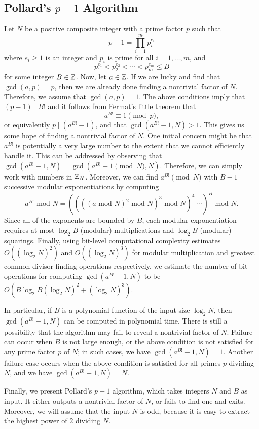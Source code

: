 \subsection{Pollard's $p-1$ Algorithm}
Let $N$ be a positive composite integer with a prime factor $p$ such that 
\[ p-1 = \prod_{i=1}^m p_i^{e_i} \] 
where $e_i \geq 1$ is an integer and $p_i$ is prime for all $i = 1, \dots, m$, and 
\[ p_1^{e_1} < p_2^{e_2} < \cdots < p_m^{e_m} \leq B \] 
for some integer $B \in \mathbb{Z}$. Now, let $a \in \mathbb{Z}$. If we are lucky and find that 
$\gcd(a, p) = p$, then we are already done finding a nontrivial factor of $N$. 
Therefore, we assume that $\gcd(a, p) = 1$. The above conditions imply that 
$(p-1) \mid B!$ and it follows from Fermat's little theorem that 
\[ a^{B!} \equiv 1 \pmod p, \] 
or equivalently $p \mid (a^{B!} - 1)$, and that $\gcd(a^{B!} - 1, N) > 1$. 
This gives us some hope of finding a nontrivial factor of $N$. One 
initial concern might be that $a^{B!}$ is potentially a very large number 
to the extent that we cannot efficiently handle it. This can be addressed by 
observing that $\gcd(a^{B!}-1, N) = \gcd(a^{B!}-1 \pmod N, N)$. Therefore, 
we can simply work with numbers in $\mathbb{Z}_N$. Moreover, we can find
$a^{B!} \pmod N$ with $B-1$ successive modular exponentiations by computing 
\[ a^{B!} \text{ mod $N$} = ((((a \text{ mod $N$})^2 \text{ mod $N$})^3
\text{ mod $N$})^4 \;\cdots)^B \text{ mod $N$}. \] 
Since all of the exponents are bounded by $B$, each modular exponentiation 
requires at most $\log_2 B$ (modular) multiplications and $\log_2 B$ 
(modular) squarings. Finally, using bit-level computational complexity 
estimates $O((\log_2 N)^2)$ and $O((\log_2 N)^3)$ for modular multiplication 
and greatest common divisor finding operations respectively, we estimate 
the number of bit operations for computing $\gcd(a^{B!}-1, N)$ to be 
$O(B\log_2 B (\log_2 N)^2 + (\log_2 N)^3)$. 

In particular, if $B$ is a polynomial function of the input size 
$\log_2 N$, then $\gcd(a^{B!} - 1, N)$ can be computed in polynomial time. 
There is still a possibility that the algorithm may fail to reveal a 
nontrivial factor of $N$. Failure can occur when $B$ is not large enough, or the 
above condition is not satisfied for any prime factor $p$ of $N$; in such 
cases, we have $\gcd(a^{B!} - 1, N) = 1$. Another failure case occurs when 
the above condition is satisfied for all primes $p$ dividing $N$, and 
we have $\gcd(a^{B!} - 1, N) = N$.  

Finally, we present Pollard's $p-1$ algorithm, which takes integers $N$ and 
$B$ as input. It either outputs a nontrivial factor of $N$, or fails to find 
one and exits. Moreover, we will assume that the input $N$ is odd, because 
it is easy to extract the highest power of $2$ dividing $N$. 

